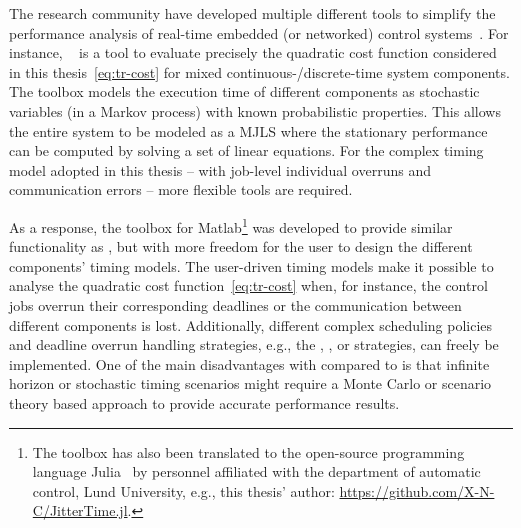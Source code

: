 The research community have developed multiple different tools to simplify the performance analysis of real-time embedded (or networked) control systems~\cite{Ohlin:2006}.
For instance, ~\cite{Lincoln:2002} is a tool to evaluate precisely the quadratic cost function considered in this thesis~\eqref{eq:tr-cost} for mixed continuous-/discrete-time system components.
The  toolbox models the execution time of different components as stochastic variables (in a Markov process) with known probabilistic properties.
This allows the entire system to be modeled as a MJLS where the stationary performance can be computed by solving a set of linear equations.
For the complex timing model adopted in this thesis -- with job-level individual overruns and communication errors -- more flexible tools are required.

As a response, the  toolbox for Matlab\footnote{The  toolbox has also been translated to the open-source programming language Julia~\cite{Julia:2017} by personnel affiliated with the department of automatic control, Lund University, e.g., this thesis' author: \url{https://github.com/X-N-C/JitterTime.jl}.} was developed to provide similar functionality as , but with more freedom for the user to design the different components' timing models.
The user-driven timing models make it possible to analyse the quadratic cost function~\eqref{eq:tr-cost} when, for instance, the control jobs overrun their corresponding deadlines or the communication between different components is lost.
Additionally, different complex scheduling policies and deadline overrun handling strategies, e.g., the \tK{}, \tS{}, or \tQ{} strategies, can freely be implemented.
One of the main disadvantages with  compared to  is that infinite horizon or stochastic timing scenarios might require a Monte Carlo or scenario theory based approach to provide accurate performance results.


